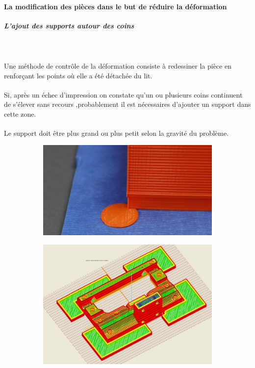 \documentclass[11pt,a4paper]{article}
\begin{document}
			\paragraph{La modification des pièces dans le but de réduire la déformation}
				\subparagraph{L’ajout des supports autour des coins}\mbox{}\\\\
Une méthode de contrôle de la déformation consiste à redessiner la pièce en renforçant les points où elle a été détachée du lit.
\\\\
Si, après un échec d’impression on constate qu’un ou plusieurs coins continuent de s’élever sans recours ,probablement il est nécessaires d’ajouter un support dans cette zone.
\\\\
Le support doit être plus grand ou plus petit selon la gravité du problème.
\begin{figure}[H]
    \centering
    \begin{subfigure}[b]{0.4\textwidth}
        \includegraphics[width=\textwidth,cfbox=azul_marcos 4pt 0pt]{FOTOS/MOUSEEAR1}
    \end{subfigure}
    \qquad %
    \begin{subfigure}[b]{0.4\textwidth}
        \includegraphics[width=\textwidth,cfbox=azul_marcos 4pt 0pt]{FOTOS/MOUSEEAR2}
    \end{subfigure}   
\end{figure}	
\end{document}
